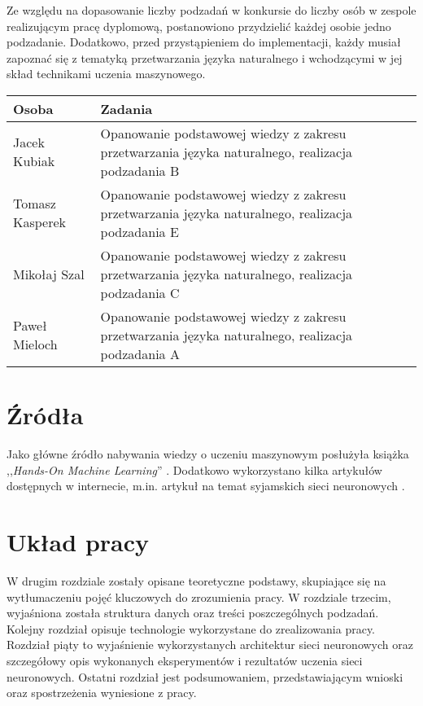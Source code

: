 Ze względu na dopasowanie liczby podzadań w konkursie do liczby osób w zespole realizującym pracę dyplomową, postanowiono przydzielić każdej osobie jedno podzadanie. Dodatkowo, przed przystąpieniem do implementacji, każdy musiał zapoznać się z tematyką przetwarzania języka naturalnego i wchodzącymi w jej skład technikami uczenia maszynowego.
\begin{center}
\begin{tabular}{ | p{3cm} | p{10cm} | }
 \hline
  Osoba & Zadania \\
 \hline
 Jacek Kubiak & Opanowanie podstawowej wiedzy z zakresu przetwarzania języka naturalnego, realizacja podzadania B \\ 
 \hline
 Tomasz Kasperek & Opanowanie podstawowej wiedzy z zakresu przetwarzania języka naturalnego, realizacja podzadania E \\  
 \hline
 Mikołaj Szal & Opanowanie podstawowej wiedzy z zakresu przetwarzania języka naturalnego, realizacja podzadania C \\
 \hline
 Paweł Mieloch & Opanowanie podstawowej wiedzy z zakresu przetwarzania języka naturalnego, realizacja podzadania A \\
 \hline
\end{tabular}
\end{center}

\section{Źródła}
Jako główne źródło nabywania wiedzy o uczeniu maszynowym posłużyła książka ,,\emph{Hands-On Machine Learning}'' \cite{handson2017}. Dodatkowo wykorzystano kilka artykułów dostępnych w internecie, m.in. artykuł na temat syjamskich sieci neuronowych \cite{malstm:medium}.

\section{Układ pracy}

W drugim rozdziale zostały opisane teoretyczne podstawy, skupiające się na wytłumaczeniu pojęć kluczowych do zrozumienia pracy. W rozdziale trzecim, wyjaśniona została struktura danych oraz treści poszczególnych podzadań. Kolejny rozdział opisuje technologie wykorzystane do zrealizowania pracy. Rozdział piąty to wyjaśnienie wykorzystanych architektur sieci neuronowych oraz szczegółowy opis wykonanych eksperymentów i rezultatów uczenia sieci neuronowych. Ostatni rozdział jest podsumowaniem, przedstawiającym wnioski oraz spostrzeżenia wyniesione z pracy.